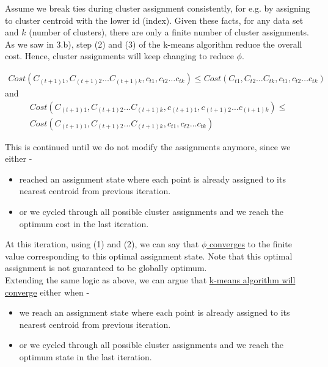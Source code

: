 \documentclass[11pt]{article}
\begin{document}
{Assume we break ties during cluster assignment consistently, for e.g. by assigning to cluster centroid with the lower id (index). Given these facts, for any data set and $k$ (number of clusters), there are only a finite number of cluster assignments. \\

As we saw in 3.b), step (2) and (3) of the k-means algorithm reduce the overall cost. Hence, cluster assignments will keep changing to reduce $\phi$.

\begin{equation}\label{eq:simple}
\begin{aligned}
Cost (C_{(t+1)1}, C_{(t+1)2} \hdots C_{(t+1)k}, c_{t1}, c_{t2} \hdots c_{tk}) \leq Cost (C_{t1}, C_{t2} \hdots C_{tk}, c_{t1}, c_{t2} \hdots c_{tk})
\end{aligned}
\end{equation} and
\begin{equation}\label{eq:simple}
\begin{aligned}
Cost (C_{(t+1)1}, C_{(t+1)2} \hdots C_{(t+1)k}, c_{(t+1)1}, c_{(t+1)2} \hdots c_{(t+1)k}) \leq \\
Cost (C_{(t+1)1}, C_{(t+1)2} \hdots C_{(t+1)k}, c_{t1}, c_{t2} \hdots c_{tk})
\end{aligned}
\end{equation}

This is continued until we do not modify the assignments anymore, since we either -
\begin{itemize}
\item reached an assignment state where each point is already assigned to its nearest centroid from previous iteration.
\item or we cycled through all possible cluster assignments and we reach the optimum cost in the last iteration.
\end{itemize}

At this iteration, using (1) and (2), we can say that \underline{$\phi$ converges} to the finite value corresponding to this optimal assignment state. Note that this optimal assignment is not guaranteed to be globally optimum.\\

Extending the same logic as above, we can argue that \underline{k-means algorithm will converge} either when -
\begin{itemize}
\item we reach an assignment state where each point is already assigned to its nearest centroid from previous iteration.
\item or we cycled through all possible cluster assignments and we reach the optimum state in the last iteration.
\end{itemize}

}
\end{document}
